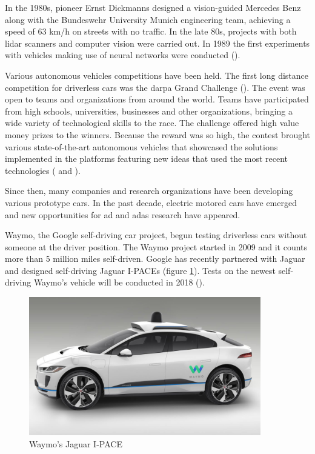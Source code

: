 In the 1980s, pioneer Ernst Dickmanns designed a vision-guided Mercedes Benz along with the Bundeswehr University Munich engineering team, achieving a speed of 63 km/h on streets with no traffic. In the late 80s, projects with both \gls{lidar} scanners and computer vision were carried out. In 1989 the first experiments with vehicles making use of neural networks were conducted (\cite{Pomerleau1989}).

Various autonomous vehicles competitions have been held. The first long distance competition for driverless cars was the \gls{darpa} Grand Challenge (\cite{DARPA}). The event was open to teams and organizations from around the world. Teams have participated from high schools, universities, businesses and other organizations, bringing a wide variety of technological skills to the race. The challenge offered high value money prizes to the winners. Because the reward was so high, the contest brought various state-of-the-art autonomous vehicles that showcased the solutions implemented in the platforms featuring new ideas that used the most recent technologies (\cite{Montemerlo2006} and \cite{Thrun2007}).

Since then, many companies and research organizations have been developing various prototype cars. In the past decade, electric motored cars have emerged and new opportunities for \gls{ad} and \gls{adas} research have appeared. 

Waymo, the Google self-driving car project, begun testing driverless cars without someone at the driver position. The Waymo project started in 2009 and it counts more than 5 million miles self-driven. Google has recently partnered with Jaguar and designed self-driving Jaguar I-PACEs (figure \ref{fig:waymo}). Tests on the newest self-driving Waymo's vehicle will be conducted in 2018 (\cite{Waymo}).


\begin{figure}[htp]
	
	\centering
	\includegraphics[width=0.9\textwidth]{capstate/imgs/waymo}
	
	\caption{Waymo's Jaguar I-PACE}
		\label{fig:waymo}
	
\end{figure}

